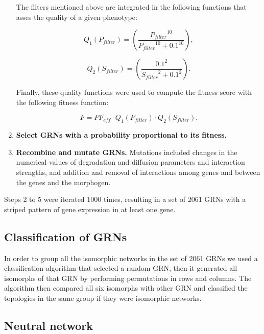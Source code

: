 \documentclass[10pt,letterpaper]{article}
\begin{document}
\begin{enumerate}
 The filters mentioned above are integrated in the following functions that 
 asses the quality of a given phenotype:
 
 \begin{equation}
  Q_1(P_{filter}) = \left( \frac{ {P_{filter}}^{10} }{ {P_{filter}}^{10} + 
  0.1^{10} } \right),
 \end{equation}
 
 \begin{equation}
  Q_2(S_{filter}) = \left( \frac{ 0.1^2 }{ {S_{filter}}^2 + 0.1^2 } \right).
 \end{equation}

 Finally, these quality functions were used to compute the fitness score with
 the following fitness function:
 
 \begin{equation}
  F = \mathit{PF_{eff}} \cdot Q_1(P_{filter}) \cdot Q_2(S_{filter}).
 \end{equation}

 \item{\bf Select GRNs with a probability proportional to its fitness.}
 
 \item{\bf Recombine and mutate GRNs.} Mutations included changes in the
 numerical values of degradation and diffusion parameters and interaction
 strengths, and addition and removal of interactions among genes and between the
 genes and the morphogen.
\end{enumerate}

Steps 2 to 5 were iterated 1000 times, resulting in a set of 2061 GRNs with a
striped pattern of gene expression in at least one gene.

\subsection*{Classification of GRNs}

In order to group all the isomorphic networks in the set of 2061 GRNs we used a
classification algorithm that selected a random GRN, then it generated all 
isomorphs of that GRN by performing permutations in rows and columns. The 
algorithm then compared all six isomorphs with other GRN and classified the 
topologies in the same group if they were isomorphic networks.

\subsection*{Neutral network}
\end{document}
